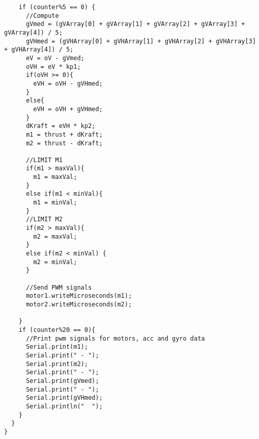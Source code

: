 \begin{lstlisting}
    if (counter%5 == 0) {
      //Compute
      gVmed = (gVArray[0] + gVArray[1] + gVArray[2] + gVArray[3] + gVArray[4]) / 5;
      gVHmed = (gVHArray[0] + gVHArray[1] + gVHArray[2] + gVHArray[3] + gVHArray[4]) / 5;
      eV = oV - gVmed;
      oVH = eV * kp1;
      if(oVH >= 0){
        eVH = oVH - gVHmed;
      }
      else{
        eVH = oVH + gVHmed;
      }
      dKraft = eVH * kp2;
      m1 = thrust + dKraft;
      m2 = thrust - dKraft;
      
      //LIMIT M1
      if(m1 > maxVal){
        m1 = maxVal; 
      }
      else if(m1 < minVal){
        m1 = minVal;
      }
      //LIMIT M2
      if(m2 > maxVal){
        m2 = maxVal;
      }
      else if(m2 < minVal) {
        m2 = minVal;
      }
   
      //Send PWM signals
      motor1.writeMicroseconds(m1);
      motor2.writeMicroseconds(m2);
   
    }
    if (counter%20 == 0){
      //Print pwm signals for motors, acc and gyro data
      Serial.print(m1);
      Serial.print(" - ");
      Serial.print(m2);
      Serial.print(" - ");
      Serial.print(gVmed);
      Serial.print(" - ");
      Serial.print(gVHmed);
      Serial.println("  ");
    }
  }
}
\end{lstlisting}